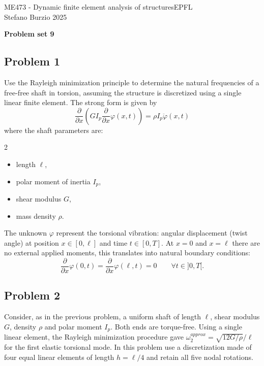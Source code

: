 \documentclass[12pt]{article}
\begin{document}
\noindent ME473 - Dynamic finite element analysis of structures\hfill EPFL\\
Stefano Burzio \hfill 2025\\
\vspace{0.3cm}

\hspace*{\fill}\textbf{\Large Problem set 9}\hspace*{\fill}

\hrulefill

\subsection*{Problem 1}
Use the Rayleigh minimization principle to determine the natural frequencies of a free-free shaft in torsion, assuming the structure is discretized using a single linear finite element. The strong form is given by
$$ \frac{\partial}{\partial x}\left(GI_p \frac{\partial}{\partial x}\varphi(x, t)\right) = \rho I_p \ddot{\varphi}(x, t)$$
where the shaft parameters are:
\begin{multicols}{2}
    \begin{itemize}
        \item length $\ell$,
        \item polar moment of inertia $I_p$,
        \item shear modulus $G$,
        \item mass density $\rho$.
    \end{itemize}
\end{multicols}
The unknown $\varphi$ represent the torsional vibration: angular displacement (twist angle) at position $x \in [0, \ell]$ and time $t \in [0, T]$. At $x = 0$ and $x = \ell$ there are no external applied moments, this translates into natural boundary conditions:
$$
    \frac{\partial}{\partial x}\varphi(0,t) = \frac{\partial}{\partial x}\varphi(\ell,t) = 0 \qquad \forall t\in]0,T[.
$$


\subsection*{Problem 2}
Consider, as in the previous problem, a uniform shaft of length $\ell$, shear modulus $G$, density $\rho$ and polar moment $I_p$. Both ends are torque-free. Using a single linear element, the Rayleigh minimization procedure gave
$\omega_2^{approx}=\sqrt{12G/\rho}/\ell$ for the first elastic torsional mode. In this problem use a discretization made of four equal linear elements of length $h=\ell/4$ and retain all five nodal rotations.
\begin{center}
\end{center}
\end{document}
